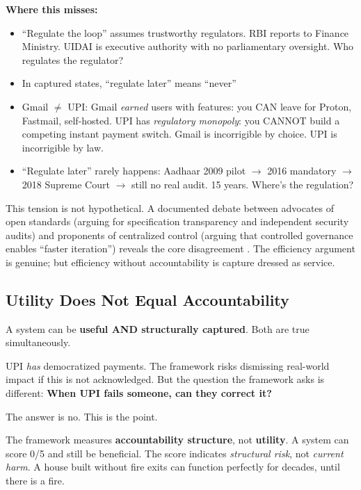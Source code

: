 \documentclass{article}
\begin{document}
\textbf{Where this misses:}
\begin{itemize}
    \item ``Regulate the loop'' assumes trustworthy regulators. RBI reports to Finance Ministry. UIDAI is executive authority with no parliamentary oversight. Who regulates the regulator?
    \item In captured states, ``regulate later'' means ``never''
    \item Gmail $\neq$ UPI: Gmail \textit{earned} users with features: you CAN leave for Proton, Fastmail, self-hosted. UPI has \textit{regulatory monopoly}: you CANNOT build a competing instant payment switch. Gmail is incorrigible by choice. UPI is incorrigible by law.
    \item ``Regulate later'' rarely happens: Aadhaar 2009 pilot $\rightarrow$ 2016 mandatory $\rightarrow$ 2018 Supreme Court $\rightarrow$ still no real audit. 15 years. Where's the regulation?
\end{itemize}

This tension is not hypothetical. A documented debate between advocates of open standards (arguing for specification transparency and independent security audits) and proponents of centralized control (arguing that controlled governance enables ``faster iteration'') reveals the core disagreement \citep{abraham2020}. The efficiency argument is genuine; but efficiency without accountability is capture dressed as service.

\subsection{Utility Does Not Equal Accountability}
\label{subsec:utility}

A system can be \textbf{useful AND structurally captured}. Both are true simultaneously.

UPI \textit{has} democratized payments. The framework risks dismissing real-world impact if this is not acknowledged. But the question the framework asks is different: \textbf{When UPI fails someone, can they correct it?}

The answer is no. This is the point.

The framework measures \textbf{accountability structure}, not \textbf{utility}. A system can score 0/5 and still be beneficial. The score indicates \textit{structural risk}, not \textit{current harm}. A house built without fire exits can function perfectly for decades, until there is a fire.
\end{document}
